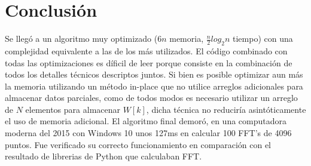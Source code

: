 \documentclass[assd_tp2_main.tex]{subfiles}
\begin{document}
\section{Conclusión}
Se llegó a un algoritmo muy optimizado ($6n$ memoria, $\frac{n}{2}log_2{n}$ tiempo) con una complejidad equivalente a las de los más utilizados.
El c\'odigo combinado con todas las optimizaciones es d\'ificil de leer porque consiste en la combinación de todos los detalles técnicos descriptos juntos.
Si bien es posible optimizar aun más la memoria utilizando un método in-place que no utilice arreglos adicionales para almacenar datos parciales, como de todos modos es necesario utilizar un arreglo de $N$ elementos para almacenar $W[k]$, dicha técnica no reduciría asintóticamente el uso de memoria adicional.
El algoritmo final demoró, en una computadora moderna del 2015 con Windows 10 unos 127ms en calcular 100 FFT's de 4096 puntos.
Fue verificado su correcto funcionamiento en comparación con el resultado de librerias de Python que calculaban FFT.
\end{document}

